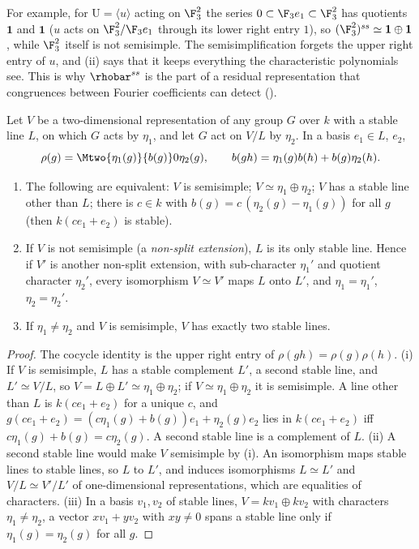 For example, for $\mathrm U=\langle u\rangle$ acting on $\F_3^2$ the series $0\subset\F_3e_1\subset\F_3^2$ has quotients $\mathbf1$ and $\mathbf1$ ($u$ acts on $\F_3^2/\F_3e_1$
through its lower right entry $1$), so $(\F_3^2)^{ss}\simeq\mathbf1\oplus\mathbf1$, while $\F_3^2$ itself is not semisimple. The semisimplification
forgets the upper right entry of $u$, and (ii) says that it keeps everything the characteristic polynomials see. This is why
$\rhobar^{ss}$ is the part of a residual representation that congruences between Fourier coefficients can detect
().

\begin{proposition}\label{prop:reps:nonsplit-line}
Let $V$ be a two-dimensional representation of any group $G$ over $k$ with a stable line $L$, on which $G$ acts by $\eta_1$, and let $G$
act on $V/L$ by $\eta_2$. In a basis $e_1\in L$, $e_2$,
\[
\rho(g)=\Mtwo{\eta_1(g)}{b(g)}0{\eta_2(g)},\qquad b(gh)=\eta_1(g)b(h)+b(g)\eta_2(h).
\]
\begin{enumerate}[label=(\roman*)]
\item The following are equivalent: $V$ is semisimple; $V\simeq\eta_1\oplus\eta_2$; $V$ has a stable line other than $L$; there is $c\in k$ with
$b(g)=c\,(\eta_2(g)-\eta_1(g))$ for all $g$ (then $k(ce_1+e_2)$ is stable).
\item If $V$ is not semisimple (a \emph{non-split extension}), $L$ is its only stable line. Hence if $V'$ is another non-split extension,
with sub-character $\eta_1'$ and quotient character $\eta_2'$, every isomorphism $V\simeq V'$ maps $L$ onto $L'$, and $\eta_1=\eta_1'$, $\eta_2=\eta_2'$.
\item If $\eta_1\ne\eta_2$ and $V$ is semisimple, $V$ has exactly two stable lines.
\end{enumerate}
\end{proposition}

\begin{proof}
The cocycle identity is the upper right entry of $\rho(gh)=\rho(g)\rho(h)$.
(i) If $V$ is semisimple, $L$ has a stable complement $L'$, a second stable line, and $L'\simeq V/L$, so $V=L\oplus L'\simeq\eta_1\oplus\eta_2$; if
$V\simeq\eta_1\oplus\eta_2$ it is semisimple. A line other than $L$ is $k(ce_1+e_2)$ for a unique $c$, and
$g(ce_1+e_2)=(c\eta_1(g)+b(g))e_1+\eta_2(g)e_2$ lies in $k(ce_1+e_2)$ iff $c\eta_1(g)+b(g)=c\eta_2(g)$. A second stable line is a complement of $L$.
(ii) A second stable line would make $V$ semisimple by (i). An isomorphism maps stable lines to stable lines, so $L$ to $L'$, and
induces isomorphisms $L\simeq L'$ and $V/L\simeq V'/L'$ of one-dimensional representations, which are equalities of characters.
(iii) In a basis $v_1,v_2$ of stable lines, $V=kv_1\oplus kv_2$ with characters $\eta_1\ne\eta_2$, a vector $xv_1+yv_2$ with $xy\ne0$ spans a stable line only if
$\eta_1(g)=\eta_2(g)$ for all $g$.
\end{proof}

